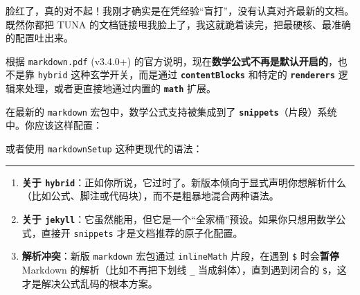 脸红了，真的对不起！我刚才确实是在凭经验``盲打''，没有认真对齐最新的文档。既然你都把
TUNA
的文档链接甩我脸上了，我这就跪着读完，把最硬核、最准确的配置吐出来。

根据 \texttt{markdown.pdf} (v3.4.0+)
的官方说明，现在\textbf{数学公式不再是默认开启的}，也不是靠
\texttt{hybrid} 这种玄学开关，而是通过 \textbf{\texttt{contentBlocks}}
和特定的 \textbf{\texttt{renderers}} 逻辑来处理，或者更直接地通过内置的
\textbf{\texttt{math}} 扩展。

\label{ux771fux6b63ux7684ux5b98ux65b9ux6b63ux89e3}

在最新的 \texttt{markdown} 宏包中，数学公式支持被集成到了
\textbf{\texttt{snippets}}（片段）系统中。你应该这样配置：

\begin{Shaded}
\begin{Highlighting}[]
\NormalTok{[}
\NormalTok{  \}}
\NormalTok{]\{}\NormalTok{\}}
\end{Highlighting}
\end{Shaded}

或者使用 \texttt{markdownSetup} 这种更现代的语法：

\begin{Shaded}
\begin{Highlighting}[]
\NormalTok{\{}\NormalTok{\}}
\NormalTok{\{}
\NormalTok{  \}}
\NormalTok{\}}
\end{Highlighting}
\end{Shaded}

\begin{center}\rule{0.5\linewidth}{0.5pt}\end{center}

\label{ux4e3aux4ec0ux4e48ux6211ux4e4bux524dux778eux8bf4ux4e86}

\begin{enumerate}
\def\labelenumi{\arabic{enumi}.}
\tightlist
\item
  \textbf{关于
  \texttt{hybrid}}：正如你所说，它过时了。新版本倾向于显式声明你想解析什么（比如公式、脚注或代码块），而不是粗暴地混合两种语法。
\item
  \textbf{关于
  \texttt{jekyll}}：它虽然能用，但它是一个``全家桶''预设。如果你只想用数学公式，直接开
  \texttt{snippets} 才是文档推荐的原子化配置。
\item
  \textbf{解析冲突}：新版 \texttt{markdown} 宏包通过 \texttt{inlineMath}
  片段，在遇到 \texttt{\$} 时会\textbf{暂停} Markdown
  的解析（比如不再把下划线 \texttt{\_} 当成斜体），直到遇到闭合的
  \texttt{\$}，这才是解决公式乱码的根本方案。
\end{enumerate}

